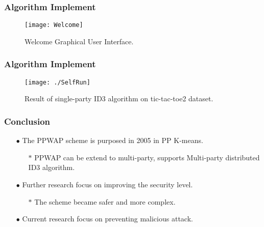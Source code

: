 \documentclass[xcolor=table]{beamer}
\begin{document}
\begin{frame}
\frametitle{Algorithm Implement}
\begin{figure}[H]
  \centering
  \texttt{[image: Welcome]}
  \caption{Welcome Graphical User Interface.}
\end{figure}
\end{frame}
\begin{frame}
\frametitle{Algorithm Implement}
\begin{figure}[H]
  \centering
  \texttt{[image: ./SelfRun]}
  \caption{Result of single-party ID3 algorithm on tic-tac-toe2 dataset.}
  \label{SelfRun}
\end{figure}

\end{frame}
\begin{frame}
\frametitle{Conclusion}

\begin{itemize} \itemsep10pt \parskip0pt 
  \item[$\bullet$] The PPWAP scheme is purposed in 2005 in PP K-means.
  \begin{itemize} \itemsep2pt \parskip0pt 
    \item[$\ast$] PPWAP can be extend to multi-party, supports Multi-party distributed ID3 algorithm.
  \end{itemize}

  \item[$\bullet$] Further research focus on improving the security level.
  \begin{itemize} \itemsep2pt \parskip0pt 
    \item[$\ast$] The scheme became safer and more complex.
  \end{itemize}

  \item[$\bullet$] Current research  focus on preventing malicious attack.
\end{itemize}
\end{frame}
\end{document}
